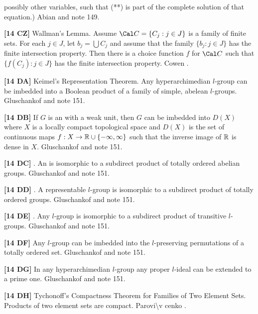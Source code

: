 possibly other variables, such that (**) is part of the complete
solution of that equation.) \ac{Abian} \cite{1973} and note 149.
\smallskip
\item{}{\bf [14 CZ]} Wallman's Lemma.  Assume $\Cal C =
\{ C_j : j\in J\}$ is a family of finite sets.  For each $j\in J$,
let $b_j =\bigcup C_j$ and assume that the family $\{ b_j : j\in J\}$
has the finite intersection property.  Then there is a choice
function  $f$ for $\Cal C$ such that $\{ f(C_j) : j\in J\}$ has
the finite intersection property.  \ac{Cowen} \cite{1983}.
\smallskip
\item{}{\bf [14 DA]} Keimel's Representation Theorem. Any hyperarchimedian
$l$-group can be imbedded into a Boolean product of a family of simple,
abelean $l$-groups. \ac{Gluschankof} \cite{1995} and note 151.
\smallskip
\item{}{\bf [14 DB]} If $G$ is an  with a weak
unit, then $G$ can be imbedded into $D(X)$ where $X$ is a locally compact
topological space and $D(X)$ is the set of continuous maps
$f: X\to \Bbb R \cup \{-\infty, \infty\}$ such that the inverse image
of $\Bbb R$ is dense in $X$.  \ac{Gluschankof} \cite{1995} and note 151.
\smallskip
\item{}{\bf [14 DC]} . An 
is isomorphic to a subdirect product of totally ordered abelian groups.
\ac{Gluschankof} \cite{1995} and note 151.
\smallskip
\item{}{\bf [14 DD]} . A representable $l$-group is
isomorphic to a subdirect product of totally ordered groups.
\ac{Gluschankof} \cite{1995} and note 151.
\smallskip
\item{}{\bf [14 DE]} . Any $l$-group is isomorphic
to a subdirect product of transitive $l$-groups. \ac{Gluschankof} \cite{1995}
and note 151.
\smallskip
\item{}{\bf [14 DF]} Any $l$-group can be imbedded into the $l$-preserving
permutations of a totally ordered set. \ac{Gluschankof} \cite{1995} and
note 151.
\smallskip
\item{}{\bf [14 DG]} In any hyperarchimedian $l$-group any proper
$l$-ideal can be extended to a prime one. \ac{Gluschankof}
\cite{1989} and note 151.
\smallskip
\item{}{\bf [14 DH]} Tychonoff's Compactness Theorem for Families of
Two Element Sets. Products of two element sets are compact.
\ac{Parovi\v cenko} \cite{1969}.
\smallskip
